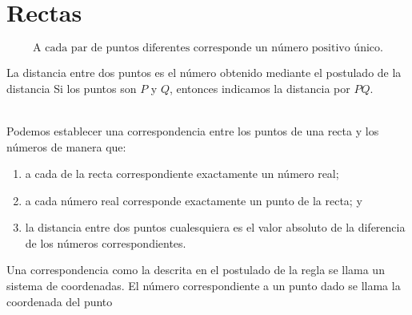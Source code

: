 \chapter{Rectas}
\begin{tcolorbox}
\begin{post}
$$\mbox{A cada par de puntos diferentes corresponde un número positivo único.}$$
\end{post}
\begin{def.}
La distancia entre dos puntos es el número obtenido mediante el postulado de la distancia Si los puntos son $P$ y $Q$, entonces indicamos la distancia por $PQ.$ \\\\
\end{def.}
\begin{post}
Podemos establecer una correspondencia entre los puntos de una recta y los números de manera que:
\begin{enumerate}[\bfseries 1)]
\item a cada de la recta correspondiente exactamente un número real;
\item a cada número real corresponde exactamente un punto de la recta; y
\item la distancia entre dos puntos cualesquiera es el valor absoluto de la diferencia de los números correspondientes.
\end{enumerate}
\end{post}
\begin{def.}
Una correspondencia como la descrita en el postulado de la regla se llama un sistema de coordenadas. El número correspondiente a un punto dado se llama la coordenada del punto
\end{def.}
\end{tcolorbox}
